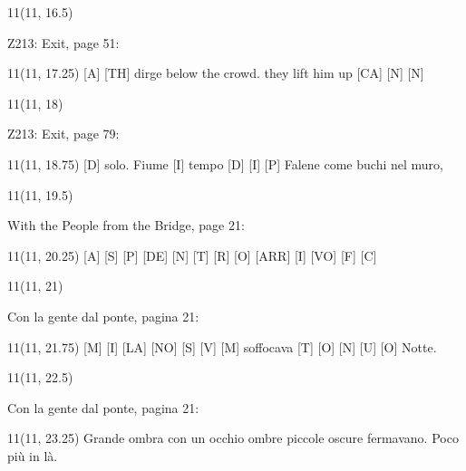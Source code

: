 \documentclass[11pt]{article}
\begin{document}
\begin{textblock}{11}(11, 16.5)
\begin{center}
\color{mypink}
Z213: Exit, page 51:
\end{center}
\end{textblock}

\begin{textblock}{11}(11, 17.25)
\color{black}
[A] [TH] dirge below the crowd. they lift him up [CA] [N] [N]
\rightskip\leftskip
\end{textblock}

\begin{textblock}{11}(11, 18)
\begin{center}
\color{mypink}
Z213: Exit, page 79:
\end{center}
\end{textblock}

\begin{textblock}{11}(11, 18.75)
\color{black}
[D] solo. Fiume [I] tempo [D] [I] [P] Falene come buchi nel muro,
\rightskip\leftskip
\end{textblock}

\begin{textblock}{11}(11, 19.5)
\begin{center}
\color{mypink}
With the People from the Bridge, page 21:
\end{center}
\end{textblock}

\begin{textblock}{11}(11, 20.25)
\color{black}
[A] [S] [P] [DE] [N] [T] [R] [O] [ARR] [I] [VO] [F] [C]
\rightskip\leftskip
\end{textblock}

\begin{textblock}{11}(11, 21)
\begin{center}
\color{mypink}
Con la gente dal ponte, pagina 21:
\end{center}
\end{textblock}

\begin{textblock}{11}(11, 21.75)
\color{black}
[M] [I] [LA] [NO] [S] [V] [M] soffocava [T] [O] [N] [U] [O] Notte.
\rightskip\leftskip
\end{textblock}

\begin{textblock}{11}(11, 22.5)
\begin{center}
\color{mypink}
Con la gente dal ponte, pagina 21:
\end{center}
\end{textblock}

\begin{textblock}{11}(11, 23.25)
\color{black}
Grande ombra con un occhio ombre piccole oscure fermavano. Poco più in là.
\rightskip\leftskip
\end{textblock}
\end{document}
